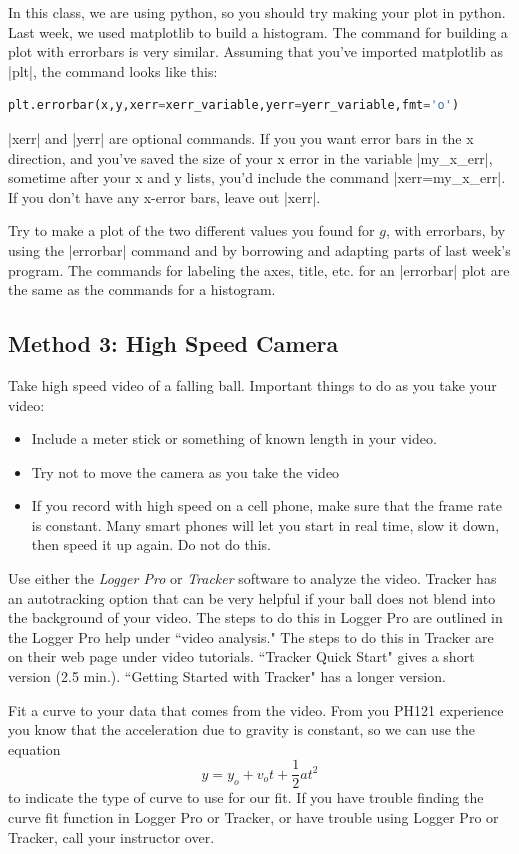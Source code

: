 \documentclass{book}
\begin{document}
In this class, we are using python, so you should try making your plot in python.  Last week, we used matplotlib to build a histogram. The command for building a plot with errorbars is very similar.  Assuming that you've imported matplotlib as |plt|, the command looks like this:
\begin{lstlisting}[language=python]
plt.errorbar(x,y,xerr=xerr_variable,yerr=yerr_variable,fmt='o')
\end{lstlisting}
|xerr| and |yerr| are optional commands. If you you want error bars in the x direction, and you've saved the size of your x error in the variable |my_x_err|, sometime after your x and y lists, you'd include the command |xerr=my_x_err|. If you don't have any x-error bars, leave out |xerr|.

  Try to make a plot of the two different values you found for $g$, with errorbars, by using the |errorbar| command and by borrowing and adapting parts of last week's program. The commands for labeling the axes, title, etc. for an |errorbar| plot are the same as the commands for a histogram.

\subsection{Method 3: High Speed Camera}

Take high speed video of a falling ball. Important things to do as you take your video:
\begin{itemize}
\item Include a meter stick or something of known length in your video. 
\item Try not to move the camera as you take the video
\item If you record with high speed on a cell phone, make sure that the frame rate is constant.  Many smart phones will let you start in real time, slow it down, then speed it up again.  Do not do this.
\end{itemize}




Use either the \emph{Logger Pro} or \emph{Tracker} software to analyze the
video. Tracker has an autotracking option that can be very helpful if your ball does not blend into the background of your video. The steps to do this in Logger Pro are outlined in the Logger Pro help under
``video analysis."  The steps to do this in Tracker are on their web page under video tutorials.  ``Tracker Quick Start" gives a short version (2.5 min.). ``Getting Started with Tracker" has a longer version.

Fit a curve to your data that comes from the video. From you PH121 experience
you know that the acceleration due to gravity is constant, so we can use the
equation
\[
y=y_{o}+v_{o}t+\frac{1}{2}at^{2}
\]
to indicate the type of curve to use for our fit. If you have trouble finding
the curve fit function in Logger Pro or Tracker, or have trouble using Logger Pro or Tracker, call
your instructor over.
\end{document}
